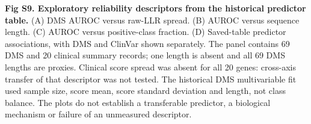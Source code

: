 \caption{{\bf Fig S9. Exploratory reliability descriptors from the historical predictor table.} (A) DMS AUROC versus raw-LLR spread. (B) AUROC versus sequence length. (C) AUROC versus positive-class fraction. (D) Saved-table predictor associations, with DMS and ClinVar shown separately. The panel contains 69 DMS and 20 clinical summary records; one length is absent and all 69 DMS lengths are proxies. Clinical score spread was absent for all 20 genes: cross-axis transfer of that descriptor was not tested. The historical DMS multivariable fit used sample size, score mean, score standard deviation and length, not class balance. The plots do not establish a transferable predictor, a biological mechanism or failure of an unmeasured descriptor.}
